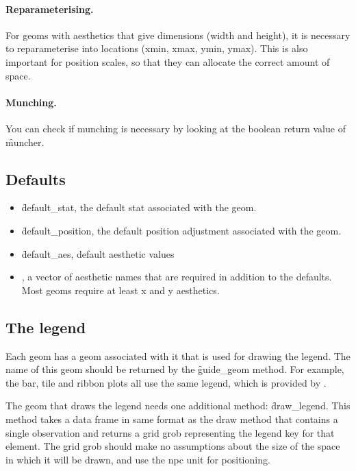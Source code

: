 \paragraph{Reparameterising.} For geoms with aesthetics that give dimensions (width and height), it is necessary to reparameterise into locations (xmin, xmax, ymin, ymax).  This is  also important for position scales, so that they can allocate the correct amount of space.

\paragraph{Munching.} You can check if munching is necessary by looking at the boolean return value of \f{muncher}. 

\subsection{Defaults}
\label{sub:defaults}

\begin{itemize}
  \item \f{default_stat}, the default stat associated with the geom.
  
  \item \f{default_position}, the default position adjustment associated with the geom.

  \item \f{default_aes}, default aesthetic values
  
  \item {}, a vector of aesthetic names that are required in addition to the defaults.  Most geoms require at least x and y aesthetics.
  
\end{itemize}

\subsection{The legend}
\label{sub:the_legend}

Each geom has a geom associated with it that is used for drawing the legend.  The name of this geom should be returned by the \f{guide_geom} method.  For example, the bar, tile and ribbon plots all use the same legend, which is provided by .

The geom that draws the legend needs one additional method: \f{draw_legend}.  This method takes a data frame in same format as the draw method that contains a single observation and returns a grid grob representing the legend key for that element.  The grid grob should make no assumptions about the size of the space in which it will be drawn, and use the npc unit for positioning.

